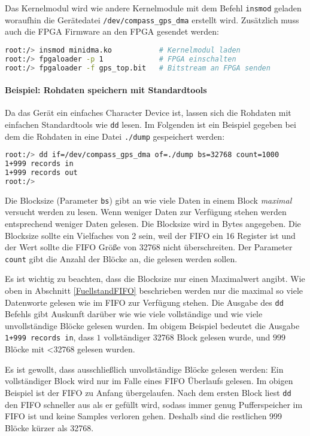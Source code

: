 Das Kernelmodul wird wie andere Kernelmodule mit dem Befehl \lstinline$insmod$ geladen woraufhin die Gerätedatei \lstinline$/dev/compass_gps_dma$ erstellt wird. Zusätzlich muss auch die FPGA Firmware an den FPGA gesendet werden:
\begin{lstlisting}[language=bash, deletekeywords={if}]
root:/> insmod minidma.ko           # Kernelmodul laden
root:/> fpgaloader -p 1             # FPGA einschalten
root:/> fpgaloader -f gps_top.bit   # Bitstream an FPGA senden
\end{lstlisting}

\paragraph{Beispiel: Rohdaten speichern mit Standardtools}
Da das Gerät ein einfaches Character Device ist, lassen sich die Rohdaten mit einfachen Standardtools wie \lstinline$dd$ lesen. Im Folgenden ist ein Beispiel gegeben bei dem die Rohdaten in eine Datei \lstinline$./dump$ gespeichert werden: 

\begin{lstlisting}[language=bash, deletekeywords={if}]
root:/> dd if=/dev/compass_gps_dma of=./dump bs=32768 count=1000
1+999 records in
1+999 records out
root:/> 
\end{lstlisting}

Die Blocksize (Parameter \lstinline$bs$) gibt an wie viele Daten in einem Block \emph{maximal} versucht werden zu lesen. Wenn weniger Daten zur Verfügung stehen werden entsprechend weniger Daten gelesen. Die Blocksize wird in Bytes angegeben. Die Blocksize sollte ein Vielfaches von 2 sein, weil der FIFO ein \SI{16}{\bit} Register ist und der Wert sollte die FIFO Größe von \SI{32768}{\byte} nicht überschreiten. Der Parameter \lstinline$count$ gibt die Anzahl der Blöcke an, die gelesen werden sollen.

Es ist wichtig zu beachten, dass die Blocksize nur einen Maximalwert angibt. Wie oben in Abschnitt \ref{FuellstandFIFO} beschrieben werden nur die maximal so viele Datenworte gelesen wie im FIFO zur Verfügung stehen. Die Ausgabe des \lstinline$dd$ Befehls gibt Auskunft darüber wie wie viele vollständige und wie viele unvollständige Blöcke gelesen wurden. Im obigem Beispiel bedeutet die Ausgabe \lstinline$1+999 records in$, dass $1$ vollständiger \SI{32768}{\byte} Block gelesen wurde, und $999$ Blöcke mit \SI{<32768}{\byte} gelesen wurden.

Es ist gewollt, dass ausschließlich unvollständige Blöcke gelesen werden: Ein vollständiger Block wird nur im Falle eines FIFO Überlaufs gelesen. Im obigen Beispiel ist der FIFO zu Anfang übergelaufen. Nach dem ersten Block liest \lstinline$dd$ den FIFO schneller aus als er gefüllt wird, sodass immer genug Pufferspeicher im FIFO ist und keine Samples verloren gehen. Deshalb sind die restlichen 999 Blöcke kürzer als \SI{32768}{\byte}.

